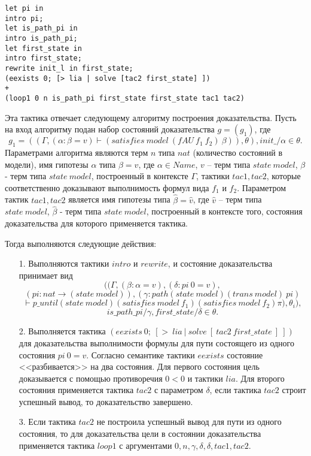 \documentclass[12pt]{article}
\begin{document}
\begin{verbatim}
let pi in
intro pi;
let is_path_pi in
intro is_path_pi;
let first_state in
intro first_state;
rewrite init_l in first_state;
(eexists 0; [> lia | solve [tac2 first_state] ])
+
(loop1 0 n is_path_pi first_state first_state tac1 tac2)
\end{verbatim}
Эта тактика отвечает следующему алгоритму построения доказательства.
Пусть на вход алгоритму подан набор состояний доказательства $g = (g_1)$, где $$g_1 = ((\Gamma, (\alpha: \beta = v) \vdash (satisfies\ model\ (fAU\ f_1\ f_2)\ \beta)), \theta), init\_/\alpha \in \theta.$$ Параметрами алгоритма являются терм $n$ типа $nat$ (количество состояний в модели), имя гипотезы $\alpha$ типа $\beta = v$, где $\alpha \in Name$, $v$ -- терм типа $state\ model$, $\beta$ - терм типа $state\ model$, построенный в контексте $\Gamma$, тактики $tac1,tac2$, которые соответственно доказывают выполнимость формул вида $f_1$ и $f_2$. Параметром тактик $tac1, tac2$ является имя гипотезы типа  $\hat{\beta} = \hat{v}$, где $\hat{v}$ -- терм типа $state\ model$, $\hat{\beta}$ - терм типа $state\ model$, построенный в контексте того, состояния доказательства для которого применяется тактика.

Тогда выполняются следующие действия:
\begin{enumerate}
    \item[1.] Выполняются тактики $intro$ и $rewrite$, и состояние доказательства принимает вид
    $$((\Gamma, (\beta:\alpha = v),(\delta: pi\ 0 = v),$$
    $$ (pi: nat \xrightarrow{} (state\ model)),(\gamma: path (state\ model) (trans\ model)\ pi) $$
    $$ \vdash  p\_until (state\ model) (satisfies\ model\ f_1) (satisfies\ model\ f_2) \pi), \theta_i),$$
    $$is\_path\_pi/\gamma, first\_state/\delta \in \theta.$$
    \item[2.] Выполняется тактика $(eexists\ 0;\ [>\ lia\ |\ solve\ [\ tac2\ first\_state\ ]\ ])$ для доказательства выполнимости формулы для пути состоящего из одного состояния $pi\ 0 = v$. Согласно семантике тактики $eexists$ состояние <<разбивается>> на два состояния. Для первого состояния цель доказывается с помощью противоречия $0<0$ и тактики $lia$. Для второго состояния применяется тактика $tac2$ с параметром $\delta$, если тактика $tac2$ строит успешный вывод, то доказательство завершено.
    \item[3.] Если тактика $tac2$ не построила успешный вывод для пути из одного состояния, то для доказательства цели в состоянии доказательства применяется тактика $loop1$ с аргументами $0, n, \gamma,\delta, \delta, tac1, tac2$.
\end{enumerate}
\end{document}
